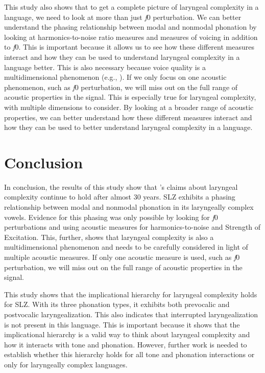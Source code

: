This study also shows that to get a complete picture of laryngeal complexity in a language, we need to look at more than just \textit{f}0 perturbation. We can better understand the phasing relationship between modal and nonmodal phonation by looking at harmonics-to-noise ratio measures and measures of voicing in addition to \textit{f}0. This is important because it allows us to see how these different measures interact and how they can be used to understand laryngeal complexity in a language better. This is also necessary because voice quality is a multidimensional phenomenon (e.g., \cite{kreimanUnifiedTheoryVoice2014,kreimanValidatingPsychoacousticModel2021}). If we only focus on one acoustic phenomenon, such as \textit{f}0 perturbation, we will miss out on the full range of acoustic properties in the signal. This is especially true for laryngeal complexity, with multiple dimensions to consider. By looking at a broader range of acoustic properties, we can better understand how these different measures interact and how they can be used to better understand laryngeal complexity in a language.

\section{Conclusion}\label{sec:conclusion_of_lc}

In conclusion, the results of this study show that \citeauthor{silvermanLaryngealComplexityOtomanguean1997}'s \citeyear{silvermanLaryngealComplexityOtomanguean1997} claims about laryngeal complexity continue to hold after almost 30 years. SLZ exhibits a phasing relationship between modal and nonmodal phonation in its laryngeally complex vowels. Evidence for this phasing was only possible by looking for \textit{f}0 perturbations and using acoustic measures for harmonics-to-noise and Strength of Excitation. This, further, shows that laryngeal complexity is also a multidimensional phenomenon and needs to be carefully considered in light of multiple acoustic measures. If only one acoustic measure is used, such as \textit{f}0 perturbation, we will miss out on the full range of acoustic properties in the signal. 

This study shows that the implicational hierarchy for laryngeal complexity holds for SLZ. With its three phonation types, it exhibits both prevocalic and postvocalic laryngealization. This also indicates that interrupted laryngealization is not present in this language. This is important because it shows that the implicational hierarchy is a valid way to think about laryngeal complexity and how it interacts with tone and phonation. However, further work is needed to establish whether this hierarchy holds for all tone and phonation interactions or only for laryngeally complex languages. 